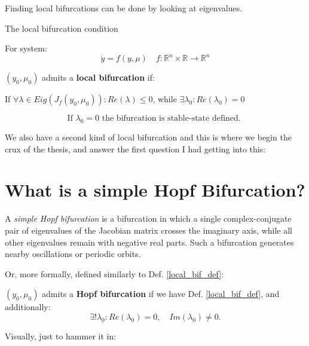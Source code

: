 Finding local bifurcations can be done by looking at eigenvalues.
\newpage
{\large The local bifurcation condition

}For system:
\begin{equation}
	\dot{y} = f(y, \mu) \quad f : \mathbb{R}^n \times \mathbb{R} \rightarrow \mathbb{R}^n
\end{equation}

\begin{definition}\label{local_bif_def}
	$(y_0,\mu_0)$ admits a \textbf{local bifurcation} if:
\end{definition}

If $\forall \lambda \in Eig(J_{f}(y_0,\mu_0)) : Re(\lambda) \leq 0$, while $\exists \lambda_0 : Re(\lambda_0) = 0$

\begin{equation}\label{stable_state_bif}
	\text{If } \lambda_0 = 0 \text{ the bifurcation is stable-state defined. }
\end{equation}

We also have a second kind of local bifurcation and this is where we begin the crux of the thesis, and answer the first question I had getting into this:

\section{What is a simple Hopf Bifurcation?}

A \textit{simple Hopf bifurcation} is a bifurcation in which a single complex-conjugate pair of eigenvalues of the Jacobian matrix crosses the imaginary axis, while all other eigenvalues remain with negative real parts. Such a bifurcation generates nearby oscillations or periodic orbits.

Or, more formally, defined similarly to Def. \ref{local_bif_def}:
\begin{definition}
	$(y_0, \mu_0)$ admits a \textbf{Hopf bifurcation} if we have Def. \ref{local_bif_def}, and additionally:
	\begin{equation}\label{hopf_bif_def}
		\exists! \lambda_0 : Re(\lambda_0) = 0, \quad
		Im(\lambda_0) \neq 0.
	\end{equation}
\end{definition}
Visually, just to hammer it in:

